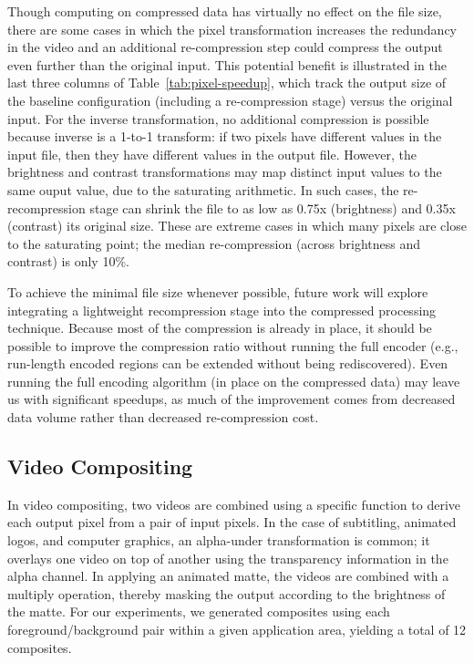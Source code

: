 Though computing on compressed data has virtually no effect on the
file size, there are some cases in which the pixel transformation
increases the redundancy in the video and an additional re-compression
step could compress the output even further than the original input.
This potential benefit is illustrated in the last three columns of
Table~\ref{tab:pixel-speedup}, which track the output size of the
baseline configuration (including a re-compression stage) versus the
original input.  For the inverse transformation, no additional
compression is possible because inverse is a 1-to-1 transform: if two
pixels have different values in the input file, then they have
different values in the output file.  However, the brightness and
contrast transformations may map distinct input values to the same
ouput value, due to the saturating arithmetic.  In such cases, the
re-recompression stage can shrink the file to as low as 0.75x
(brightness) and 0.35x (contrast) its original size.  These are
extreme cases in which many pixels are close to the saturating point;
the median re-compression (across brightness and contrast) is only
10\%.

To achieve the minimal file size whenever possible, future work will
explore integrating a lightweight recompression stage into the
compressed processing technique.  Because most of the compression is
already in place, it should be possible to improve the compression
ratio without running the full encoder (e.g., run-length encoded
regions can be extended without being rediscovered).  Even running the
full encoding algorithm (in place on the compressed data) may leave us
with significant speedups, as much of the improvement comes from
decreased data volume rather than decreased re-compression cost.

\subsection{Video Compositing}

In video compositing, two videos are combined using a specific
function to derive each output pixel from a pair of input pixels.  In
the case of subtitling, animated logos, and computer graphics, an
alpha-under transformation is common; it overlays one video on top of
another using the transparency information in the alpha channel.  In
applying an animated matte, the videos are combined with a multiply
operation, thereby masking the output according to the brightness of
the matte.  For our experiments, we generated composites using each
foreground/background pair within a given application area, yielding a
total of 12 composites.

